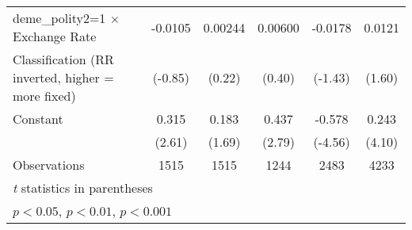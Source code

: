 \begin{table}[htbp]
\begin{tabular}{l*{5}{c}}
\addlinespace
deme\_polity2=1 $\times$ Exchange Rate   &  -0.0105         &  0.00244         &  0.00600         &  -0.0178         &   0.0121         \\
Classification (RR inverted, higher = more fixed)&  (-0.85)         &   (0.22)         &   (0.40)         &  (-1.43)         &   (1.60)         \\
\addlinespace
Constant                                &    0.315\sym{*}  &    0.183         &    0.437\sym{**} &   -0.578\sym{***}&    0.243\sym{***}\\
                                        &   (2.61)         &   (1.69)         &   (2.79)         &  (-4.56)         &   (4.10)         \\
\midrule
Observations                            &     1515         &     1515         &     1244         &     2483         &     4233         \\
\bottomrule
\multicolumn{6}{l}{\footnotesize \textit{t} statistics in parentheses}\\
\multicolumn{6}{l}{\footnotesize \sym{*} \(p<0.05\), \sym{**} \(p<0.01\), \sym{***} \(p<0.001\)}\\
\end{tabular}
\end{table}
